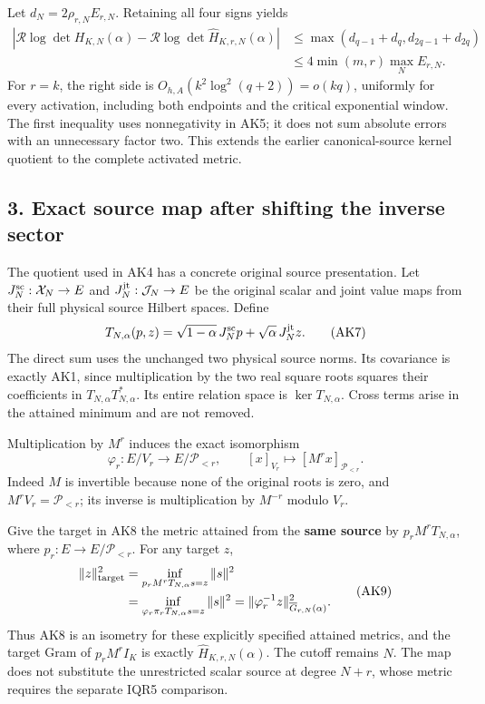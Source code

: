 Let \(d_N=2\rho_{r,N}E_{r,N}\). Retaining all four signs yields \[
\begin{split}
\left|\mathcal R\log\det H_{K,N}(\alpha)
-\mathcal R\log\det\widehat H_{K,r,N}(\alpha)\right|
&\le \max(d_{q-1}+d_q,d_{2q-1}+d_{2q})\\
&\le4\min(m,r)\max_N E_{r,N}.
\end{split}
\tag{AK6}
\] For \(r=k\), the right side is \(O_{h,A}(k^2\log^2(q+2))=o(kq)\), uniformly for every activation, including both endpoints and the critical exponential window. The first inequality uses nonnegativity in AK5; it does not sum absolute errors with an unnecessary factor two. This extends the earlier canonical-source kernel quotient to the complete activated metric.

\subsection{3. Exact source map after shifting the inverse sector}\label{exact-source-map-after-shifting-the-inverse-sector}

The quotient used in AK4 has a concrete original source presentation. Let \(J_N^{\rm sc}:\mathcal X_N\to E\) and \(J_N^{\rm jt}:\mathcal J_N\to E\) be the original scalar and joint value maps from their full physical source Hilbert spaces. Define \[
T_{N,\alpha}(p,z)
 =\sqrt{1-\alpha}\,J_N^{\rm sc}p+
   \sqrt{\alpha}\,J_N^{\rm jt}z .
\tag{AK7}
\] The direct sum uses the unchanged two physical source norms. Its covariance is exactly AK1, since multiplication by the two real square roots squares their coefficients in \(T_{N,\alpha}T_{N,\alpha}^*\). Its entire relation space is \(\ker T_{N,\alpha}\). Cross terms arise in the attained minimum and are not removed.

Multiplication by \(M^r\) induces the exact isomorphism \[
\varphi_r:E/V_r\longrightarrow E/\mathcal P_{<r},
\qquad [x]_{V_r}\longmapsto[M^rx]_{\mathcal P_{<r}}. \tag{AK8}
\] Indeed \(M\) is invertible because none of the original roots is zero, and \(M^rV_r=\mathcal P_{<r}\); its inverse is multiplication by \(M^{-r}\) modulo \(V_r\).

Give the target in AK8 the metric attained from the \textbf{same source} by \(p_rM^rT_{N,\alpha}\), where \(p_r:E\to E/\mathcal P_{<r}\). For any target \(z\), \[
\begin{split}
\|z\|_{\rm target}^2
&=\inf_{p_rM^rT_{N,\alpha}s=z}\|s\|^2\\
&=\inf_{\varphi_r\pi_rT_{N,\alpha}s=z}\|s\|^2
=\|\varphi_r^{-1}z\|_{\overline G_{r,N}(\alpha)}^2 .
\end{split}\tag{AK9}
\] Thus AK8 is an isometry for these explicitly specified attained metrics, and the target Gram of \(p_rM^rI_K\) is exactly \(\widehat H_{K,r,N}(\alpha)\). The cutoff remains \(N\). The map does not substitute the unrestricted scalar source at degree \(N+r\), whose metric requires the separate IQR5 comparison.

